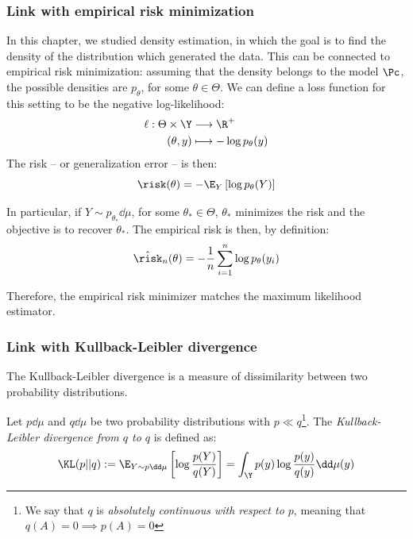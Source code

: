 \documentclass[toc, titlepaged]{../cs-classes/cs-classes}
\begin{document}
\subsubsection{Link with empirical risk minimization}
In this chapter, we studied density estimation, in which the goal is to find the density of the distribution which generated the data. This can be connected to empirical risk minimization: assuming that the density belongs to the model $\Pc$, the possible densities are $p_\theta$, for some $\theta\in\Theta$. We can define a loss function for this setting to be the negative log-likelihood:
\begin{equation}
    \begin{aligned}
        \ell : \Theta\times\Y &\longrightarrow \R^+ \\
        (\theta, y) &\longmapsto -\log p_\theta(y)
    \end{aligned}
\end{equation}
The risk -- or generalization error -- is then:
\begin{equation}
    \risk(\theta) = - \E_Y\left[\log p_\theta(Y)\right]
\end{equation}

In particular, if $Y\sim p_{\theta_*}\dd\mu$, for some $\theta_*\in\Theta$, $\theta_*$ minimizes the risk and the objective is to recover $\theta_*$. The empirical risk is then, by definition:
\begin{equation}
    \hat{\risk}_n(\theta) = -\frac{1}{n}\sum_{i=1}^n \log p_\theta(y_i)
\end{equation}

Therefore, the empirical risk minimizer matches the maximum likelihood estimator.

\subsubsection{Link with Kullback-Leibler divergence}
The Kullback-Leibler divergence is a measure of dissimilarity between two probability distributions.

\begin{definition}
    Let $p\dd\mu$ and $q\dd\mu$ be two probability distributions with $p\ll q$\footnote{We say that $q$ is \emph{absolutely continuous with respect to $p$}, meaning that $q(A)=0\implies p(A)=0$}. The \emph{Kullback-Leibler divergence from $q$ to $q$} is defined as:
    \begin{equation}
        \KL(p||q) := \E_{Y\sim p\dd\mu} \left[\log\frac{p(Y)}{q(Y)}\right] = \int_{\Y}p(y)\log\frac{p(y)}{q(y)}\dd\mu(y)
    \end{equation}
\end{definition}
\end{document}
